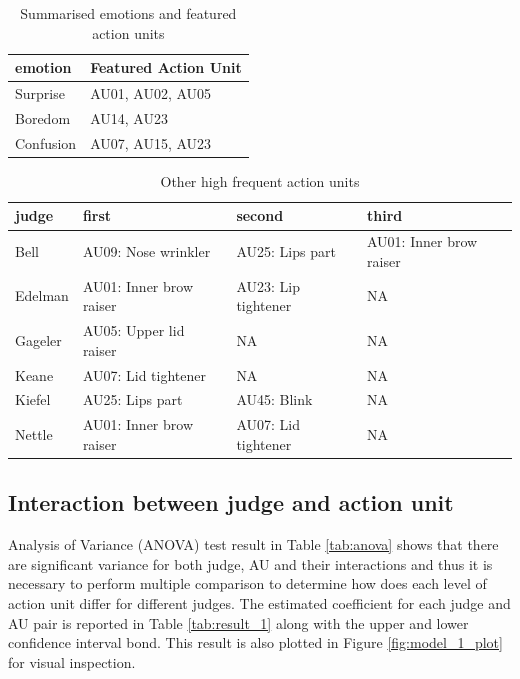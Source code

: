 \documentclass{monashthesis}
\begin{document}
\begin{table}[t]

\caption{\label{tab:unnamed-chunk-6}\label{tab:three_category} Summarised emotions and featured action units}
\centering
\begin{tabular}{l|l}
\hline
emotion & Featured Action Unit\\
\hline
Surprise & AU01, AU02, AU05\\
\hline
Boredom & AU14, AU23\\
\hline
Confusion & AU07, AU15, AU23\\
\hline
\end{tabular}
\end{table}

\begin{table}[t]

\caption{\label{tab:unnamed-chunk-7}\label{tab:other_highf} Other high frequent action units }
\centering
\begin{tabular}{l|l|l|l}
\hline
judge & first & second & third\\
\hline
Bell & AU09: Nose wrinkler & AU25: Lips part & AU01: Inner brow raiser\\
\hline
Edelman & AU01: Inner brow raiser & AU23: Lip tightener & NA\\
\hline
Gageler & AU05: Upper lid raiser & NA & NA\\
\hline
Keane & AU07: Lid tightener & NA & NA\\
\hline
Kiefel & AU25: Lips part & AU45: Blink & NA\\
\hline
Nettle & AU01: Inner brow raiser & AU07: Lid tightener & NA\\
\hline
\end{tabular}
\end{table}

\hypertarget{interaction-between-judge-and-action-unit}{%
\subsection{Interaction between judge and action unit}\label{interaction-between-judge-and-action-unit}}

Analysis of Variance (ANOVA) test result in Table \ref{tab:anova} shows that there are significant variance for both judge, AU and their interactions and thus it is necessary to perform multiple comparison to determine how does each level of action unit differ for different judges. The estimated coefficient for each judge and AU pair is reported in Table \ref{tab:result_1} along with the upper and lower confidence interval bond. This result is also plotted in Figure \ref{fig:model_1_plot} for visual inspection.
\end{document}

